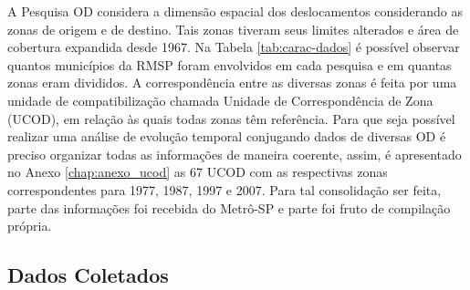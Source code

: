 A Pesquisa OD considera a dimensão espacial dos deslocamentos considerando as zonas de origem e de destino. Tais zonas tiveram seus limites alterados e área de cobertura expandida desde 1967. Na Tabela \ref{tab:carac-dados} é possível observar quantos municípios da RMSP foram envolvidos em cada pesquisa e em quantas zonas eram divididos. A correspondência entre as diversas zonas é feita por uma unidade de compatibilização chamada Unidade de Correspondência de Zona (UCOD), em relação às quais todas zonas têm referência. Para que seja possível realizar uma análise de evolução temporal conjugando dados de diversas OD é preciso organizar todas as informações de maneira coerente, assim, é apresentado no Anexo \ref{chap:anexo_ucod} as 67 UCOD  com as respectivas zonas correspondentes para 1977, 1987, 1997 e 2007. Para tal consolidação ser feita, parte das informações foi recebida do Metrô-SP e parte foi fruto de compilação própria.


\begin{table}[htb]
\end{table}


\subsection{Dados Coletados}\label{subsec:subsec:OD-dados-coletados}

